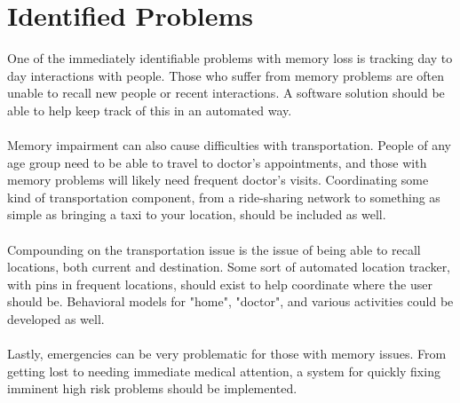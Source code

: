 \documentclass[12pt]{article}
\theoremstyle{plain}
\theoremstyle{definition}
\begin{document}
\section*{Identified Problems}
One of the immediately identifiable problems with memory loss is tracking day to day interactions with people.  Those who suffer from memory problems are often unable to recall new people or recent interactions. A software solution should be able to help keep track of this in an automated way.\\
\\
Memory impairment can also cause difficulties with transportation.  People of any age group need to be able to travel to doctor's appointments, and those with memory problems will likely need frequent doctor's visits. Coordinating some kind of transportation component, from a ride-sharing network to something as simple as bringing a taxi to your location, should be included as well.\\
\\
Compounding on the transportation issue is the issue of being able to recall locations, both current and destination. Some sort of automated location tracker, with pins in frequent locations, should exist to help coordinate where the user should be.  Behavioral models for "home", "doctor", and various activities could be developed as well.\\
\\
Lastly, emergencies can be very problematic for those with memory issues.  From getting lost to needing immediate medical attention, a system for quickly fixing imminent high risk problems should be implemented.\\
\end{document}
